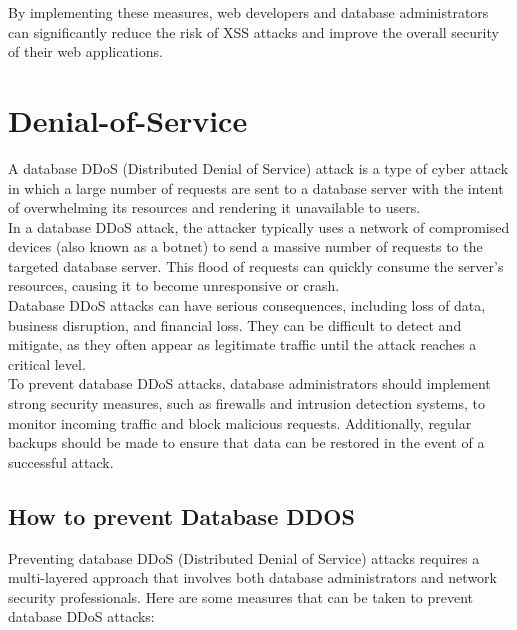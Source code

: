 \documentclass[11pt]{article}
\let\oldsection\section
\renewcommand\section{\clearpage\oldsection}
\begin{document}
By implementing these measures, web developers and database administrators can significantly reduce the risk of XSS attacks and improve the overall security of their web applications.\\

\section{Denial-of-Service}
\label{sec:org1d2bbdb}

A database DDoS (Distributed Denial of Service) attack is a type of cyber attack in which a large number of requests are sent to a database server with the intent of overwhelming its resources and rendering it unavailable to users.\\

In a database DDoS attack, the attacker typically uses a network of compromised devices (also known as a botnet) to send a massive number of requests to the targeted database server. This flood of requests can quickly consume the server's resources, causing it to become unresponsive or crash.\\

Database DDoS attacks can have serious consequences, including loss of data, business disruption, and financial loss. They can be difficult to detect and mitigate, as they often appear as legitimate traffic until the attack reaches a critical level.\\

To prevent database DDoS attacks, database administrators should implement strong security measures, such as firewalls and intrusion detection systems, to monitor incoming traffic and block malicious requests. Additionally, regular backups should be made to ensure that data can be restored in the event of a successful attack.\\

\subsection{How to prevent Database DDOS}
\label{sec:orga7fb048}

Preventing database DDoS (Distributed Denial of Service) attacks requires a multi-layered approach that involves both database administrators and network security professionals. Here are some measures that can be taken to prevent database DDoS attacks:\\
\end{document}
